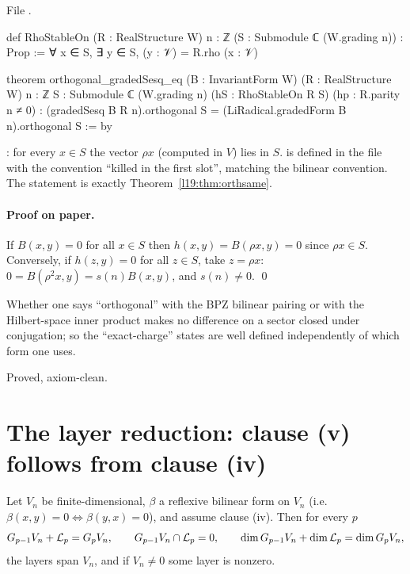 \noindent File .
\begin{leancode}
def RhoStableOn (R : RealStructure W) {n : ℤ} (S : Submodule ℂ (W.grading n)) : Prop :=
  ∀ x ∈ S, ∃ y ∈ S, (y : 𝒱) = R.rho (x : 𝒱)

theorem orthogonal_gradedSesq_eq (B : InvariantForm W) (R : RealStructure W) {n : ℤ}
    {S : Submodule ℂ (W.grading n)} (hS : RhoStableOn R S) (hp : R.parity n ≠ 0) :
    (gradedSesq B R n).orthogonal S = (LiRadical.gradedForm B n).orthogonal S := by
\end{leancode}

\begin{dictionary}
: for every $x\in S$ the vector $\rho x$ (computed in $V$) lies in $S$.
 is defined in the file with the convention ``killed in the first slot'',
matching the bilinear convention. The statement is exactly Theorem~\ref{l19:thm:orthsame}.
\end{dictionary}

\paragraph{Proof on paper.} If $B(x,y)=0$ for all $x\in S$ then $h(x,y) = B(\rho x,y) = 0$ since
$\rho x\in S$. Conversely, if $h(z,y) = 0$ for all $z\in S$, take $z = \rho x$: $0 = B(\rho^2x,y) =
s(n)B(x,y)$, and $s(n)\ne0$. \qed

\begin{physics}
Whether one says ``orthogonal'' with the BPZ bilinear pairing or with the Hilbert-space inner
product makes no difference on a sector closed under conjugation; so the ``exact-charge'' states are
well defined independently of which form one uses.
\end{physics}

\begin{status}
Proved, axiom-clean.
\end{status}

\section{The layer reduction: clause (v) follows from clause (iv)}\label{l19:sec:reduction}

\begin{theorem}\label{l19:thm:layerdec}
Let $V_n$ be finite-dimensional, $\beta$ a reflexive bilinear form on $V_n$ (i.e.\ $\beta(x,y) = 0\iff
\beta(y,x) = 0$), and assume clause (iv). Then for every $p$
\begin{equation*}
 G_{p-1}V_n + \mathcal{L}_p = G_pV_n,\qquad
 G_{p-1}V_n\cap\mathcal{L}_p = 0,\qquad
 \dim G_{p-1}V_n + \dim\mathcal{L}_p = \dim G_pV_n,
\end{equation*}
the layers span $V_n$, and if $V_n\ne0$ some layer is nonzero.
\end{theorem}

